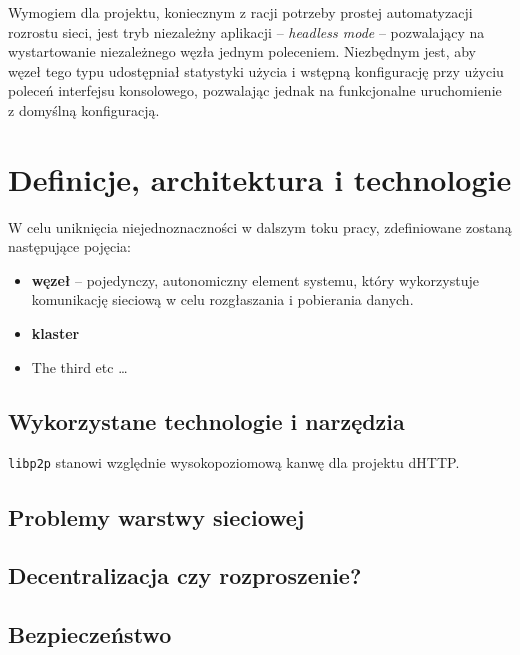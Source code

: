Wymogiem dla projektu, koniecznym z racji potrzeby prostej automatyzacji rozrostu sieci, jest tryb niezależny aplikacji -- {\em headless mode} -- pozwalający na wystartowanie niezależnego węzła jednym poleceniem. Niezbędnym jest, aby węzeł tego typu udostępniał statystyki użycia i wstępną konfigurację przy użyciu poleceń interfejsu konsolowego, pozwalając jednak na funkcjonalne uruchomienie z domyślną konfiguracją.


\section{Definicje, architektura i technologie}
\label{sec:zalozeniaProjektu}

W celu uniknięcia niejednoznaczności w dalszym toku pracy, zdefiniowane zostaną następujące pojęcia:

\begin{itemize}
    \item \textbf{węzeł} -- pojedynczy, autonomiczny element systemu, który wykorzystuje komunikację sieciową w celu rozgłaszania i pobierania danych.
    \item \textbf{klaster}
    \item The third etc \ldots
  \end{itemize}

\subsection{Wykorzystane technologie i narzędzia}
\label{sec:techNTools}
\texttt{libp2p} stanowi względnie wysokopoziomową kanwę dla projektu dHTTP.

\subsection{Problemy warstwy sieciowej}
\label{sec:networkIssues}

\subsection{Decentralizacja czy rozproszenie?}
\label{sec:decentralizacjaCzyRozproszenie}

\subsection{Bezpieczeństwo}
\label{sec:security}

